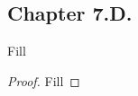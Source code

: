 \subsection*{Chapter 7.D. }


\begin{exercise}{1}
  Fill
\end{exercise}
\begin{proof}
 Fill
\end{proof}